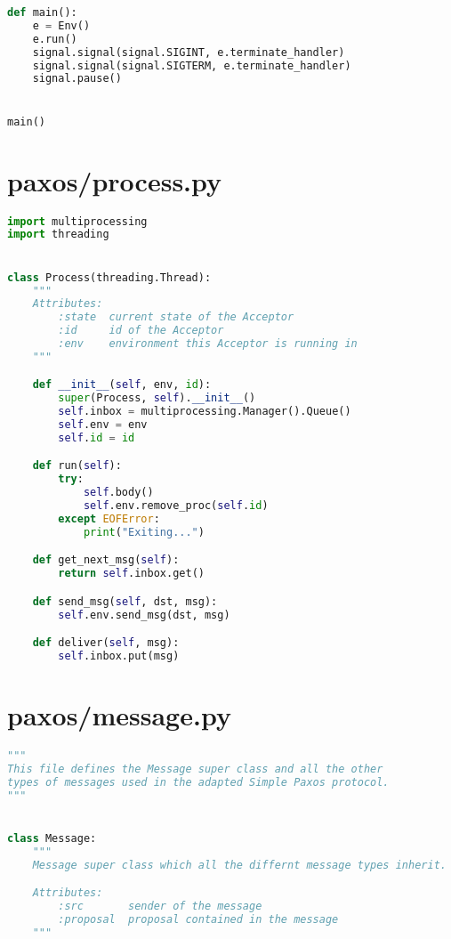 \begin{landscape}
\begin{multicols*}{2}
\begin{lstlisting}[style=SourceCodeListing,language=Python]
def main():
    e = Env()
    e.run()
    signal.signal(signal.SIGINT, e.terminate_handler)
    signal.signal(signal.SIGTERM, e.terminate_handler)
    signal.pause()


main()
\end{lstlisting}
\end{multicols*}

\newpage

\begin{multicols*}{2}
\section{paxos/process.py}
\begin{lstlisting}[style=SourceCodeListing,language=Python]
import multiprocessing
import threading


class Process(threading.Thread):
    """
    Attributes:
        :state  current state of the Acceptor
        :id     id of the Acceptor
        :env    environment this Acceptor is running in
    """

    def __init__(self, env, id):
        super(Process, self).__init__()
        self.inbox = multiprocessing.Manager().Queue()
        self.env = env
        self.id = id

    def run(self):
        try:
            self.body()
            self.env.remove_proc(self.id)
        except EOFError:
            print("Exiting...")

    def get_next_msg(self):
        return self.inbox.get()

    def send_msg(self, dst, msg):
        self.env.send_msg(dst, msg)

    def deliver(self, msg):
        self.inbox.put(msg)
\end{lstlisting}

\vfill\null
\columnbreak

\section{paxos/message.py}
\begin{lstlisting}[style=SourceCodeListing,language=Python]
"""
This file defines the Message super class and all the other
types of messages used in the adapted Simple Paxos protocol.
"""


class Message:
    """
    Message super class which all the differnt message types inherit.

    Attributes:
        :src       sender of the message
        :proposal  proposal contained in the message
    """


\end{lstlisting}
\end{multicols*}
\end{landscape}
